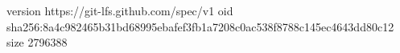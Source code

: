 version https://git-lfs.github.com/spec/v1
oid sha256:8a4c982465b31bd68995ebafef3fb1a7208c0ac538f8788c145ec4643dd80c12
size 2796388
